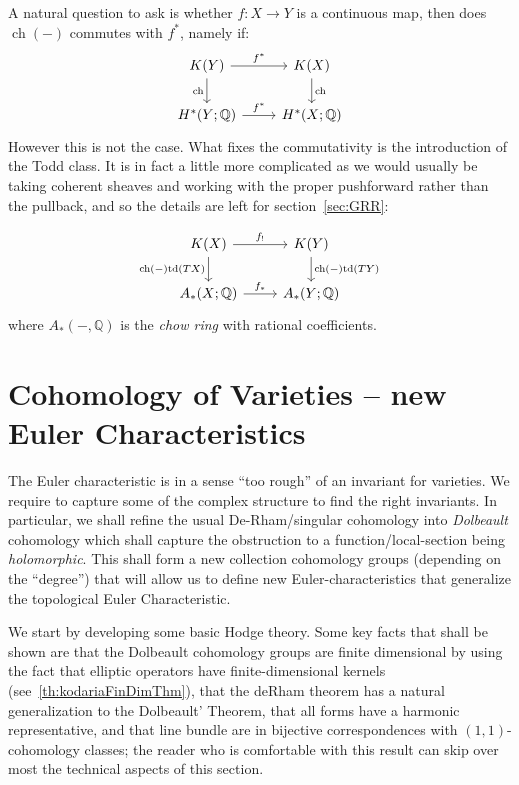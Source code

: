 \documentclass{book}
\newcommand{\Q}{{\mathbb{Q}}}
\newcommand{\ch}{{\operatorname{ch}}}
\newcommand{\td}{{\operatorname{td}}}
\renewcommand{\ch}{{\operatorname{ch}}}
\begin{document}
A natural question to ask is whether $f: X \to Y$ is a continuous map, then does $\ch(-)$ commutes with $f^*$, namely
if:
\[
\begin{tikzcd}
K(Y) \arrow[r, "f^*"] \arrow[d, "\ch"'] & K(X) \arrow[d, "\ch"] \\
H^*(Y; \Q) \arrow[r, "f^*"]             & H^*(X; \Q)
\end{tikzcd}
\]
However this is not the case. What fixes the commutativity is the introduction of the Todd class. It is in
fact a little more complicated as we would usually be taking coherent sheaves and working with the
proper pushforward rather than the pullback, and so the details are left for section~\ref{sec:GRR}:

\[
\begin{tikzcd}
K(X) \arrow[r, "f_!"] \arrow[d, "\ch(-)\td(TX)"'] & K(Y) \arrow[d, "\ch(-)\td(TY)"] \\
A_*(X; \Q) \arrow[r, "f_*"]             & A_*(Y; \Q)
\end{tikzcd}
\]
where $A_*(-, \Q)$ is the \emph{chow ring} with rational coefficients.

\chapter{Cohomology of Varieties -- new Euler Characteristics}\label{cha:cohomVarieties}

The Euler characteristic is in a sense ``too rough'' of an invariant for varieties. We require to capture some
of the complex structure to find the right invariants. In particular, we shall refine the usual
De-Rham/singular cohomology into \emph{Dolbeault} cohomology which shall capture the obstruction to
a function/local-section being \emph{holomorphic}. This shall form a new collection cohomology groups (depending on
the ``degree'') that will allow us to define new Euler-characteristics that generalize the topological Euler
Characteristic.

We start by developing some basic Hodge theory. Some key facts that shall be shown are that the Dolbeault
cohomology groups are finite dimensional by using the fact that elliptic operators have finite-dimensional
kernels (see~\cref{th:kodariaFinDimThm}), that the deRham theorem has a natural generalization to the
Dolbeault' Theorem, that all forms have a harmonic representative, and that line bundle are in bijective
correspondences with $(1,1)$-cohomology classes; the reader who is comfortable with this result can skip over
most the technical aspects of this section.
\end{document}

